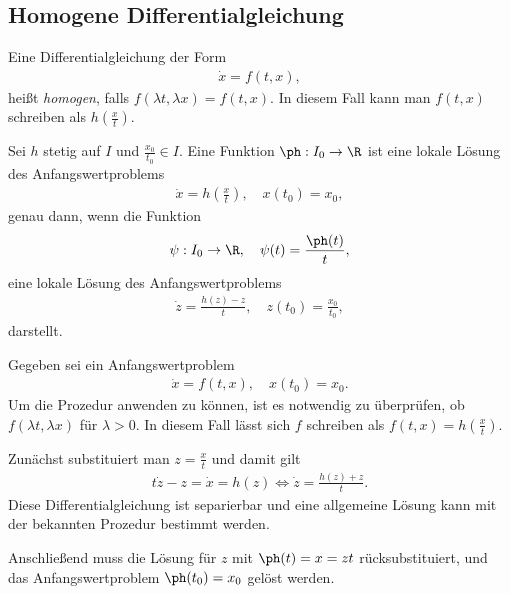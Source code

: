 \subsection{Homogene Differentialgleichung}

\begin{defn}
Eine Differentialgleichung der Form
\begin{align*}
\dot{x} = f(t,x),
\end{align*}
heißt \emph{homogen}, falls $f(\lambda t, \lambda x) = f(t,x)$. In diesem Fall
kann man $f(t,x)$ schreiben als $h\left(\frac{x}{t}\right)$.
\end{defn}

\begin{prop}
Sei $h$ stetig auf $I$ und $\frac{x_0}{t_0}\in I$. Eine Funktion $\ph : I_0\to
\R$ ist eine lokale Lösung des Anfangswertproblems
\begin{align*}
\dot{x} = h\left(\frac{x}{t}\right),\quad x(t_0) = x_0, 
\end{align*}
genau dann, wenn die Funktion
\begin{align*}
\psi: I_0\to\R,\quad \psi(t) = \frac{\ph(t)}{t}, 
\end{align*}
eine lokale Lösung des Anfangswertproblems
\begin{align*}
\dot{z} = \frac{h(z) - z}{t},\quad z(t_0) = \frac{x_0}{t_0},
\end{align*}
darstellt.
\end{prop}

\begin{prop}[Prozedur]
Gegeben sei ein Anfangswertproblem
\begin{align*}
\dot{x} = f(t,x),\quad x(t_0) = x_0.
\end{align*}
Um die Prozedur anwenden zu können, ist es notwendig zu überprüfen, ob $f(\lambda t,\lambda x)$ für $\lambda >
0$. In diesem Fall lässt sich $f$ schreiben als $f(t,x) = h\left(\frac{x}{t}\right)$.

Zunächst substituiert man $z = \frac{x}{t}$ und damit gilt
\begin{align*}
t\dot{z} - z = \dot{x} = h(z) \Leftrightarrow \dot{z} = \frac{h(z)+z}{t}.
\end{align*} 
Diese Differentialgleichung ist separierbar und eine allgemeine Lösung kann mit
der bekannten Prozedur bestimmt werden.

Anschließend muss die Lösung für $z$ mit $\ph(t) = x = zt$ rücksubstituiert, und
das Anfangswertproblem $\ph(t_0) = x_0$ gelöst werden.
\end{prop}